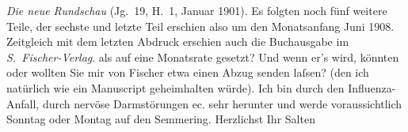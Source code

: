\begin{ledgroupsized}[t]{13cm}
{{{                     \emph{Die neue Rundschau} (Jg. 19, H. 1,
                        Januar 1901). Es folgten noch fünf weitere Teile, der sechste und letzte Teil erschien
                  also um den Monatsanfang Juni 1908. Zeitgleich mit dem letzten
                  Abdruck erschien auch die Buchausgabe im \emph{S. Fischer-Verlag}.}}}\label{K_L03509-1h} als auf eine Monatsrate gesetzt? Und wenn er’s
               wird, könnten oder wollten Sie mir von Fischer
               etwa einen Abzug senden laſsen? (den ich natürlich wie ein Manuscript geheimhalten
               würde). Ich bin durch den Influenza-Anfall, durch nervöse Darmstörungen ec. sehr
               herunter und werde voraussichtlich Sonntag oder Montag auf den Semmering.\pend
           \pstart Herzlichst Ihr \spacefill\mbox{Salten}\pend{}
         
         \endnumbering{}\end{ledgroupsized}\begin{anhang}\end{anhang}\newcommand{\dateiname}{L03509}\newcommand{\titel}{Felix Salten an Arthur Schnitzler, 16. 1. 1908}\newcommand{\editorInnen}{Martin Anton Müller und Laura Untner}
      